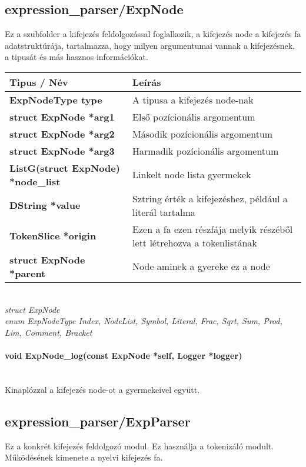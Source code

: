 \documentclass{article}[12pt,a4paper]
\newcommand{\fn}[1]{\paragraph{#1}\mbox{}\\}
\begin{document}
    \subsection{expression\_parser/ExpNode}
    Ez a szubfolder a kifejezés feldolgozással foglalkozik, a kifejezés node a kifejezés fa adatstruktúrája, tartalmazza, hogy milyen argumentumai vannak a kifejezésnek, a tipusát és más hasznos információkat.
    \begin{center}
        \begin{tabular}{ | p{5.5cm} || p{5.5cm} | }
            \hline
            \textbf{Tipus / Név} & Leírás \\
            \hline
            \textbf{ExpNodeType type} & A tipusa a kifejezés node-nak\\
            \hline
            \textbf{struct ExpNode *arg1} & Első pozícionális argomentum\\
            \hline
            \textbf{struct ExpNode *arg2} & Második pozícionális argomentum\\
            \hline
            \textbf{struct ExpNode *arg3} & Harmadik pozícionális argomentum\\
            \hline
            \textbf{ListG(struct ExpNode) *node\_list} & Linkelt node lista gyermekek\\
            \hline
            \textbf{DString *value} & Sztring érték a kifejezéshez, például a literál tartalma\\
            \hline
            \textbf{TokenSlice *origin} & Ezen a fa ezen részfája melyik részéből lett létrehozva a tokenlistának\\
            \hline
            \textbf{struct ExpNode *parent} & Node aminek a gyereke ez a node\\
            \hline
        \end{tabular}\\
        \textit{struct ExpNode}\\
        \textit{enum ExpNodeType { Index,
        NodeList,
        Symbol,
        Literal,
        Frac,
        Sqrt,
        Sum,
        Prod,
        Lim,
        Comment,
        Bracket}}
    \end{center}

    \fn{void ExpNode\_log(const ExpNode *self, Logger *logger)}
    Kinaplózzal a kifejezés node-ot a gyermekeivel együtt.

    \subsection{expression\_parser/ExpParser}
    Ez a konkrét kifejezés feldolgozó modul.
    Ez használja a tokenizáló modult.
    Működésének kimenete a nyelvi kifejezés fa.
\end{document}
